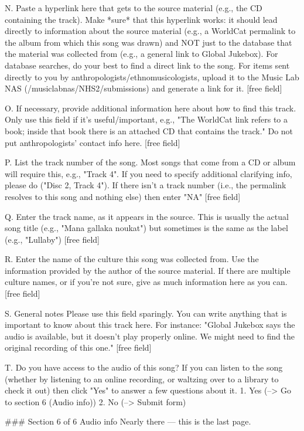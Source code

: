 N. Paste a hyperlink here that gets to the source material (e.g., the CD containing the track).
Make *sure* that this hyperlink works: it should lead directly to information about the source material (e.g., a WorldCat permalink to the album from which this song was drawn) and NOT just to the database that the material was collected from (e.g., a general link to Global Jukebox). For database searches, do your best to find a direct link to the song. For items sent directly to you by anthropologists/ethnomusicologists, upload it to the Music Lab NAS (/musiclabnas/NHS2/submissions) and generate a link for it.
[free field]

O. If necessary, provide additional information here about how to find this track.
Only use this field if it's useful/important, e.g., "The WorldCat link refers to a book; inside that book there is an attached CD that contains the track." Do not put anthropologists' contact info here.
[free field]

P. List the track number of the song.
Most songs that come from a CD or album will require this, e.g., "Track 4". If you need to specify additional clarifying info, please do ("Disc 2, Track 4"). If there isn't a track number (i.e., the permalink resolves to this song and nothing else) then enter "NA"
[free field]

Q. Enter the track name, as it appears in the source.
This is usually the actual song title (e.g., "Mana gallaka noukat") but sometimes is the same as the label (e.g., "Lullaby")
[free field]

R. Enter the name of the culture this song was collected from.
Use the information provided by the author of the source material. If there are multiple culture names, or if you're not sure, give as much information here as you can.
[free field]

S. General notes
Please use this field sparingly. You can write anything that is important to know about this track here. For instance: "Global Jukebox says the audio is available, but it doesn't play properly online. We might need to find the original recording of this one."
[free field]

T. Do you have access to the audio of this song?
If you can listen to the song (whether by listening to an online recording, or waltzing over to a library to check it out) then click "Yes" to answer a few questions about it.
1. Yes (--> Go to section 6 (Audio info))
2. No (--> Submit form)

### Section 6 of 6
Audio info
Nearly there — this is the last page.

